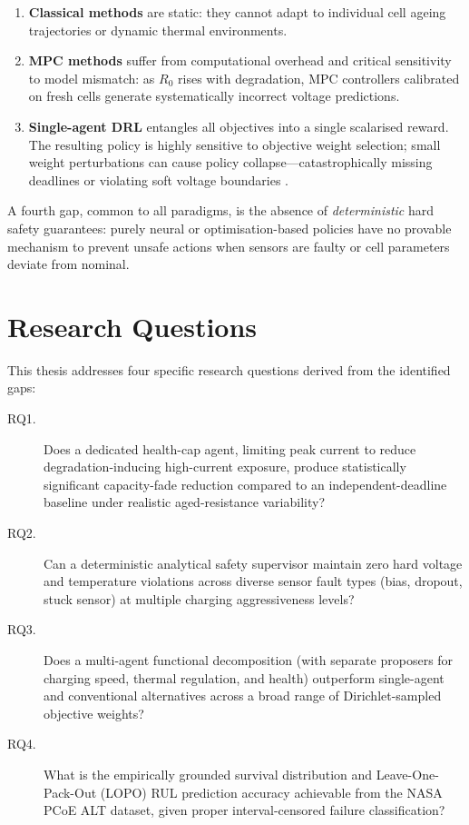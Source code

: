 \begin{enumerate}
  \item \textbf{Classical methods} are static: they cannot adapt to
  individual cell ageing trajectories or dynamic thermal environments.

  \item \textbf{MPC methods} suffer from computational overhead and
  critical sensitivity to model mismatch: as $R_0$ rises with
  degradation, MPC controllers calibrated on fresh cells generate
  systematically incorrect voltage predictions.

  \item \textbf{Single-agent DRL} entangles all objectives into a
  single scalarised reward.  The resulting policy is highly sensitive
  to objective weight selection; small weight perturbations can cause
  policy collapse---catastrophically missing deadlines or violating
  soft voltage boundaries \cite{achiam2017cpo}.
\end{enumerate}

A fourth gap, common to all paradigms, is the absence of
\emph{deterministic} hard safety guarantees: purely neural or
optimisation-based policies have no provable mechanism to
prevent unsafe actions when sensors are faulty or cell parameters
deviate from nominal.

\section{Research Questions}

This thesis addresses four specific research questions derived from
the identified gaps:

\begin{description}
  \item[RQ1.] Does a dedicated health-cap agent, limiting peak current
  to reduce degradation-inducing high-current exposure, produce
  statistically significant capacity-fade reduction compared to an
  independent-deadline baseline under realistic aged-resistance
  variability?

  \item[RQ2.] Can a deterministic analytical safety supervisor
  maintain zero hard voltage and temperature violations across diverse
  sensor fault types (bias, dropout, stuck sensor) at multiple
  charging aggressiveness levels?

  \item[RQ3.] Does a multi-agent functional decomposition
  (with separate proposers for charging speed, thermal regulation, and
  health) outperform single-agent and conventional alternatives across
  a broad range of Dirichlet-sampled objective weights?

  \item[RQ4.] What is the empirically grounded survival distribution
  and Leave-One-Pack-Out (LOPO) RUL prediction accuracy achievable
  from the NASA PCoE ALT dataset, given proper interval-censored
  failure classification?
\end{description}

